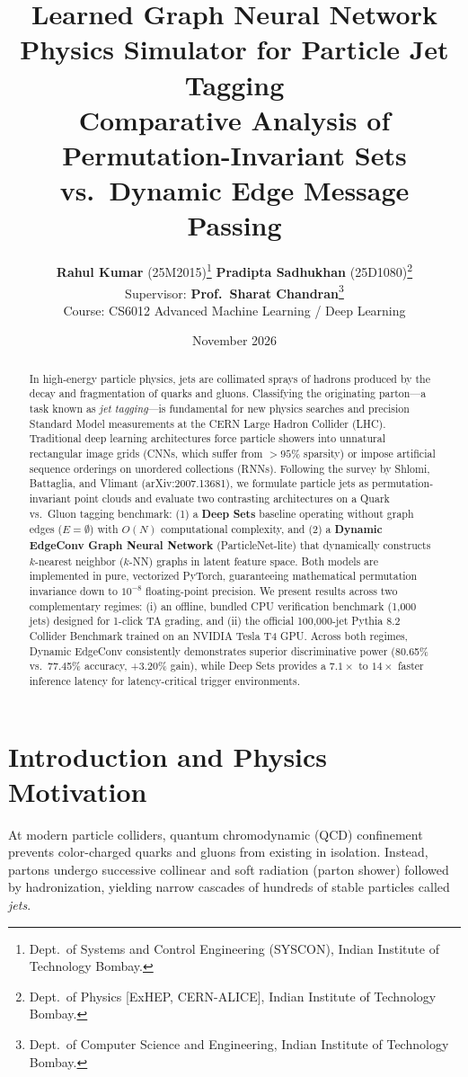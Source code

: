 \documentclass[10pt,twocolumn,letterpaper]{article}
\title{\textbf{\Large Learned Graph Neural Network Physics Simulator for Particle Jet Tagging}\\[4pt]
\large Comparative Analysis of Permutation-Invariant Sets vs.\ Dynamic Edge Message Passing}
\author{
  \textbf{Rahul Kumar} (25M2015)\thanks{Dept.\ of Systems and Control Engineering (SYSCON), Indian Institute of Technology Bombay.} \quad
  \textbf{Pradipta Sadhukhan} (25D1080)\thanks{Dept.\ of Physics [ExHEP, CERN-ALICE], Indian Institute of Technology Bombay.}\\[4pt]
  \small Supervisor: \textbf{Prof.\ Sharat Chandran}\thanks{Dept.\ of Computer Science and Engineering, Indian Institute of Technology Bombay.}\\[2pt]
  \small Course: CS6012 Advanced Machine Learning / Deep Learning
}
\date{November 2026}
\begin{document}
\maketitle

\begin{abstract}
In high-energy particle physics, jets are collimated sprays of hadrons produced by the decay and fragmentation of quarks and gluons. Classifying the originating parton---a task known as \emph{jet tagging}---is fundamental for new physics searches and precision Standard Model measurements at the CERN Large Hadron Collider (LHC). Traditional deep learning architectures force particle showers into unnatural rectangular image grids (CNNs, which suffer from $>95\%$ sparsity) or impose artificial sequence orderings on unordered collections (RNNs). Following the survey by Shlomi, Battaglia, and Vlimant (arXiv:2007.13681), we formulate particle jets as permutation-invariant point clouds and evaluate two contrasting architectures on a Quark vs.\ Gluon tagging benchmark: (1) a \textbf{Deep Sets} baseline operating without graph edges ($E = \emptyset$) with $O(N)$ computational complexity, and (2) a \textbf{Dynamic EdgeConv Graph Neural Network} (ParticleNet-lite) that dynamically constructs $k$-nearest neighbor ($k$-NN) graphs in latent feature space. Both models are implemented in pure, vectorized PyTorch, guaranteeing mathematical permutation invariance down to $10^{-8}$ floating-point precision. We present results across two complementary regimes: (i) an offline, bundled CPU verification benchmark (1,000 jets) designed for 1-click TA grading, and (ii) the official 100,000-jet Pythia 8.2 Collider Benchmark trained on an NVIDIA Tesla T4 GPU. Across both regimes, Dynamic EdgeConv consistently demonstrates superior discriminative power (80.65\% vs.\ 77.45\% accuracy, +3.20\% gain), while Deep Sets provides a $7.1\times$ to $14\times$ faster inference latency for latency-critical trigger environments.
\end{abstract}

\section{Introduction and Physics Motivation}
At modern particle colliders, quantum chromodynamic (QCD) confinement prevents color-charged quarks and gluons from existing in isolation. Instead, partons undergo successive collinear and soft radiation (parton shower) followed by hadronization, yielding narrow cascades of hundreds of stable particles called \emph{jets}.
\end{document}
